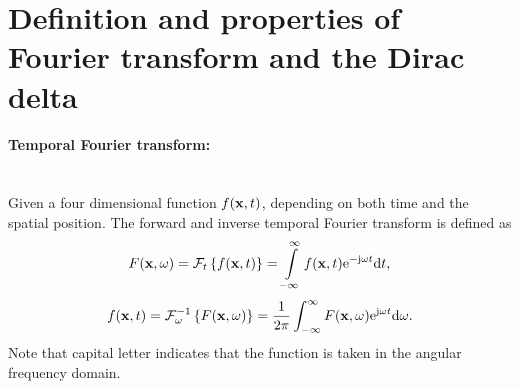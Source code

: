 \section{Definition and properties of Fourier transform and the Dirac delta}
\label{App:Fourier_def}

\paragraph{Temporal Fourier transform:}\mbox{} \\
Given a four dimensional function $f(\mathbf{x},t)$, depending on both time and the spatial position.
The forward and inverse temporal Fourier transform is defined as 
\begin{equation}
\label{eq:temporal_fourier_transform_def}
F(\mathbf{x},\omega) = \mathcal{F}_t \left\{ f(\mathbf{x},t) \right\} = \int\limits_ {-\infty}^{\infty} f(\mathbf{x},t) \mathrm{e}^{-\mathrm{j} \omega t} \mathrm{d} t,
\end{equation}
\begin{equation}
\label{eq:temporal_inverse_fourier_transform_def}
f(\mathbf{x},t) = \mathcal{F}_{\omega}^{-1} \left\{ F(\mathbf{x},\omega) \right\} = \frac{1}{2\pi} \int_ {-\infty}^{\infty} F(\mathbf{x},\omega) \mathrm{e}^{ \mathrm{j} \omega t} \mathrm{d} \omega.
\end{equation}
Note that capital letter indicates that the function is taken in the angular frequency domain.
%
